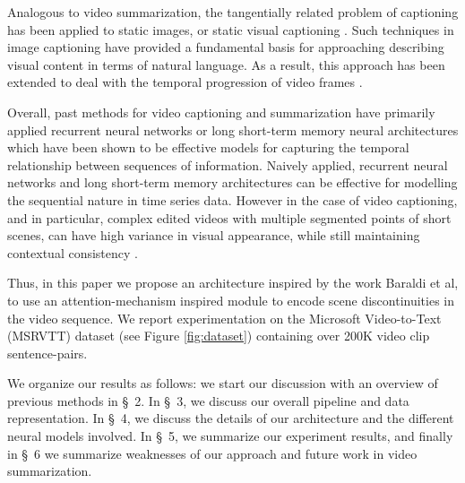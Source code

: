 \documentclass[11pt,a4paper]{article}
\begin{document}
Analogous to video summarization, the tangentially related problem of captioning
has been applied to static images, or static visual captioning
\cite{DBLP:journals/corr/VinyalsTBE14, DBLP:journals/corr/KarpathyF14,
DBLP:journals/corr/XuBKCCSZB15, DBLP:journals/corr/VinyalsTBE16}. Such
techniques in image captioning have provided a fundamental basis for approaching
describing visual content in terms of natural language. As a result, this
approach has been extended to deal with the temporal progression of video
frames \cite{2015arXiv150208029Y, DBLP:journals/corr/SutskeverVL14,
DBLP:journals/corr/YuWHYX15}. 

Overall, past methods for video captioning and summarization have primarily
applied recurrent neural networks \cite{DBLP:journals/corr/abs-1808-03314,
DBLP:journals/corr/abs-1801-01078, DBLP:journals/corr/Lipton15} or long short-term memory neural
architectures \cite{hochreiter1997long, olah_2015}
which have been shown to be effective models for capturing the temporal
relationship between sequences of information. Naively applied, recurrent neural
networks and long short-term memory architectures can be effective for modelling
the sequential nature in time series data. However in the case of video
captioning, and in particular, complex edited videos with multiple segmented
points of short scenes, can have high variance in visual appearance, while still
maintaining contextual consistency \cite{DBLP:journals/corr/BaraldiGC16b}. 

Thus, in this paper we propose an architecture inspired by the work Baraldi et
al, \cite{DBLP:journals/corr/BaraldiGC16b} to use an attention-mechanism
inspired module to encode scene discontinuities in the video sequence. We report
experimentation on the Microsoft Video-to-Text (MSRVTT) dataset (see Figure \ref{fig:dataset})
\cite{inproceedings_Brad} containing over 200K video clip sentence-pairs. 

We organize our results as follows: we start our discussion with an overview of
previous methods in \S~2. In \S~3, we discuss our overall pipeline and
data representation. In \S~4, we discuss the details of our architecture
and the different neural models involved. In \S~5, we summarize our
experiment results, and finally in \S~6 we summarize weaknesses of our approach and future work in
video summarization.
\end{document}

